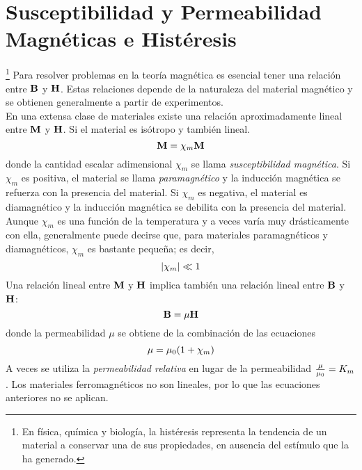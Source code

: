 \section{Susceptibilidad y Permeabilidad Magnéticas e Histéresis}\footnote{En física, química y biología, la histéresis representa la tendencia de un material a conservar una de sus propiedades, en ausencia del estímulo que la ha generado.}
Para resolver problemas en la teoría magnética es esencial tener una relación entre $\vb{B}$ y $\vb{H}$. Estas relaciones depende de la naturaleza del material magnético y se obtienen generalmente a partir de experimentos. \\

En una extensa clase de materiales existe una relación aproximadamente lineal entre $\vb{M}$ y $\vb{H}$. Si el material es isótropo y también lineal.
\begin{equation}
    \vb{M} = \chi _m \vb{M}
\end{equation}
donde la cantidad escalar adimensional $\chi _m$ se llama \textit{susceptibilidad magnética}. Si $\chi _m$ es positiva, el material se llama \textit{paramagnético} y la inducción magnética se refuerza con la presencia del material. Si $\chi _m$ es negativa, el material es diamagnético y la inducción magnética se debilita con la presencia del material. Aunque $\chi _m$ es una función de la temperatura y a veces varía muy drásticamente con ella, generalmente puede decirse que, para materiales paramagnéticos y diamagnéticos, $\chi _m$ es bastante pequeña; es decir,
\begin{equation}
    \abs{\chi _m} \ll 1
\end{equation}
Una relación lineal entre $\vb{M}$ y $\vb{H}$ implica también una relación lineal entre $\vb{B}$ y $\vb{H}$:
\begin{equation}
    \vb{B} = \mu \vb{H}
\end{equation}
donde la permeabilidad $\mu$ se obtiene de la combinación de las ecuaciones
\begin{equation}
    \mu = \mu_0 (1 + \chi _m)
\end{equation}
A veces se utiliza la \textit{permeabilidad relativa} en lugar de la permeabilidad $\frac{\mu}{\mu_0} = K_m$. Los materiales ferromagnéticos no son lineales, por lo que las ecuaciones anteriores no se aplican. \\


